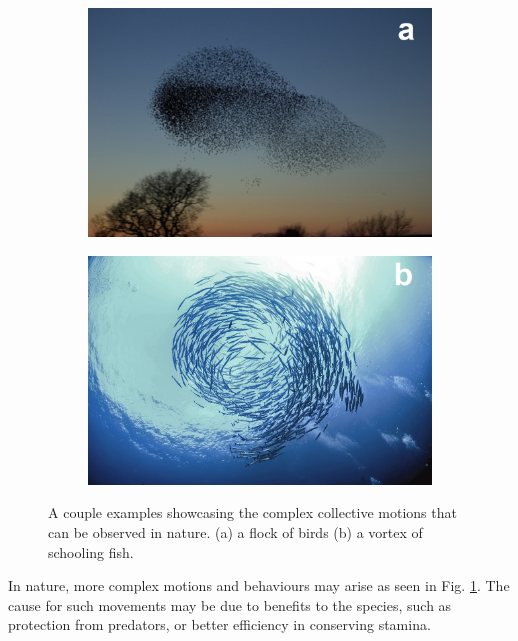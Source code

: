 \documentclass[%
11pt,
amsmath, amssymb,
aps,
pra
]{revtex4-2}
\begin{document}
\begin{figure}[t]
    \begin{subfigure}{0.45\textwidth}
        \includegraphics[width=\linewidth]{images/pictures/starling-flock.jpg}
    \end{subfigure}
    \begin{subfigure}{0.45\textwidth}
        \includegraphics[width=\linewidth]{images/pictures/fish-school.jpg}
    \end{subfigure}
    \caption{A couple examples showcasing the complex collective motions that can be observed in nature.
    (a) a flock of birds
    (b) a vortex of schooling fish.}
    \label{fig:ExamplesOfCollectiveMotion}
\end{figure}

In nature, more complex motions and behaviours may arise as seen in Fig. \ref{fig:ExamplesOfCollectiveMotion}. The cause for 
such movements may be due to benefits to the species, such as protection from predators, or better efficiency in conserving stamina.
\end{document}
